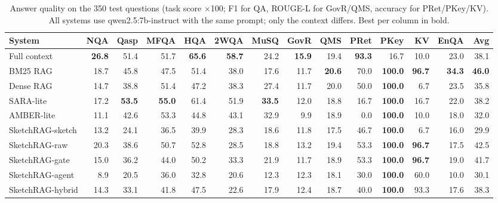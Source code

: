 \begin{table}[t]
\centering
\caption{Answer quality on the 350 test questions (task score $\times$100; F1 for QA, ROUGE-L for GovR/QMS, accuracy for PRet/PKey/KV). All systems use qwen2.5:7b-instruct with the same prompt; only the context differs. Best per column in bold.}
\label{tab:main}
\setlength{\tabcolsep}{4.2pt}
\begin{tabular}{lrrrrrrrrrrrrr}
\toprule
System & NQA & Qasp & MFQA & HQA & 2WQA & MuSQ & GovR & QMS & PRet & PKey & KV & EnQA & \textbf{Avg} \\
\midrule
Full context & \textbf{26.8} & 51.4 & 51.7 & \textbf{65.6} & \textbf{58.7} & 24.2 & \textbf{15.9} & 19.4 & \textbf{93.3} & 16.7 & 10.0 & 23.0 & 38.1 \\
BM25 RAG & 18.7 & 45.8 & 47.5 & 51.4 & 38.0 & 17.6 & 11.7 & \textbf{20.6} & 70.0 & \textbf{100.0} & \textbf{96.7} & \textbf{34.3} & \textbf{46.0} \\
Dense RAG & 14.7 & 38.8 & 51.4 & 47.2 & 38.3 & 27.4 & 11.7 & 20.0 & 50.0 & \textbf{100.0} & 6.7 & 23.5 & 35.8 \\
SARA-lite & 17.2 & \textbf{53.5} & \textbf{55.0} & 61.4 & 51.9 & \textbf{33.5} & 12.0 & 18.8 & 16.7 & \textbf{100.0} & 16.7 & 22.0 & 38.2 \\
AMBER-lite & 11.1 & 42.6 & 53.3 & 44.8 & 43.1 & 32.9 & 9.9 & 18.9 & 0.0 & \textbf{100.0} & 10.0 & 18.0 & 32.0 \\
\midrule
SketchRAG-sketch & 13.2 & 24.1 & 36.5 & 39.9 & 28.3 & 18.6 & 11.8 & 17.5 & 46.7 & \textbf{100.0} & 6.7 & 16.0 & 29.9 \\
SketchRAG-raw & 20.3 & 38.6 & 50.7 & 52.8 & 28.5 & 18.8 & 13.2 & 19.4 & 53.3 & \textbf{100.0} & \textbf{96.7} & 17.5 & 42.5 \\
SketchRAG-gate & 15.0 & 36.2 & 44.0 & 50.2 & 33.3 & 21.9 & 11.7 & 18.9 & 53.3 & \textbf{100.0} & \textbf{96.7} & 19.0 & 41.7 \\
SketchRAG-agent & 8.9 & 20.5 & 36.0 & 32.8 & 20.6 & 12.3 & 12.3 & 18.1 & 30.0 & \textbf{100.0} & 60.0 & 10.0 & 30.1 \\
SketchRAG-hybrid & 14.3 & 33.1 & 41.8 & 47.5 & 22.6 & 17.9 & 12.4 & 18.7 & 40.0 & \textbf{100.0} & 93.3 & 17.6 & 38.3 \\
\bottomrule
\end{tabular}
\end{table}
